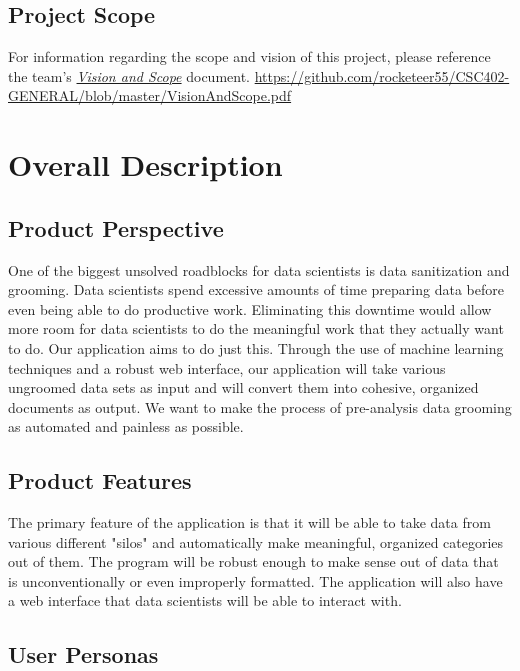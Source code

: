 \documentclass[12pt,oneside,letterpaper]{article}
\begin{document}
\subsection{Project Scope}
For information regarding the scope and vision of this project, please reference the team's \textit{\underline{Vision and Scope}} document.\newline\newline
\url{https://github.com/rocketeer55/CSC402-GENERAL/blob/master/VisionAndScope.pdf}


\section{Overall Description}
\subsection{Product Perspective}
One of the biggest unsolved roadblocks for data scientists is data sanitization and grooming. Data scientists spend excessive amounts of time preparing data before even being able to do productive work. Eliminating this downtime would allow more room for data scientists to do the meaningful work that they actually want to do. Our application aims to do just this. Through the use of machine learning techniques and a robust web interface, our application will take various ungroomed data sets as input and will convert them into cohesive, organized documents as output. We want to make the process of pre-analysis data grooming as automated and painless as possible. 
\subsection{Product Features}
The primary feature of the application is that it will be able to take data from various different "silos" and automatically make meaningful, organized categories out of them. The program will be robust enough to make sense out of data that is unconventionally or even improperly formatted. The application will also have a web interface that data scientists will be able to interact with.
\subsection{User Personas}
\end{document}
